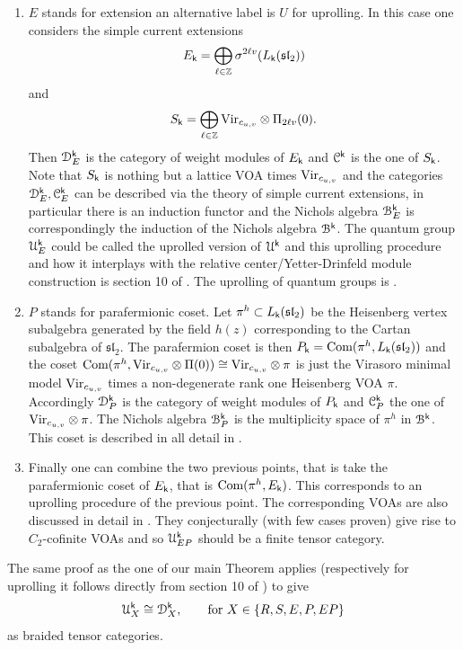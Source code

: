 \documentclass[a4paper, reqno]{amsart}
\theoremstyle{introTheorems}
\newcommand\cB{\mathcal{B}}
\newcommand\cC{\mathcal{C}}
\newcommand\cD{\mathcal{D}}
\newcommand\cU{\mathcal{U}}
\renewcommand\sl{\mathfrak{sl}}
\newcommand\Vir{\textup{Vir}}
\renewcommand{\1}{\mathbbold{1}}
\begin{document}
\begin{enumerate}
    The coset $\text{Com}(L_\ell(\sl_2), L_\ell(\sl_{2|1}))$ for $\ell$ related to $\k$ via the Feigin-Frenkel type relation $(\ell+1)(\k+1)=1$ can be described by a different, but similar, convolution operation.
    \item[(E)] $E$ stands for extension an alternative label is $U$ for uprolling. 
    In this case one considers the simple current extensions
    \[
    E_\k = \bigoplus_{\ell \in \mathbb Z} \sigma^{2\ell v}(L_\k(\sl_2))
    \]
    and 
    \[
    S_\k = \bigoplus_{\ell \in \mathbb Z} \Vir_{c_{u,v}}\otimes \Pi_{2\ell v}(0).
    \]
    Then $\cD^\k_E$ is the category of weight modules of $E_{\mathsf{k}}$ and $\cC^\k$ is the one of $S_{\mathsf{k}}$. Note that $S_{\mathsf{k}}$ is nothing but a lattice VOA times $\Vir_{c_{u,v}}$ and the categories $\cD^\k_E, \cC^\k_E$ can be described via the theory of simple current extensions, in particular there is an induction functor and the Nichols algebra $\cB^\k_E$ is correspondingly the induction of the Nichols algebra $\cB^\k$. The quantum group $\cU^\k_E$ could be called the uprolled version of $\cU^\k$ and this uprolling procedure and how it interplays with the relative center/Yetter-Drinfeld module construction is section 10 of \cite{CLR23}. The uprolling of quantum groups is \cite{CR4}.
    \item[(P)] $P$ stands for parafermionic coset. Let $\pi^h \subset L_\k(\sl_2)$ be the Heisenberg vertex subalgebra generated by the field $h(z)$ corresponding to the Cartan subalgebra of $\sl_2$. The parafermion coset is then $P_\k=\text{Com}(\pi^h, L_\k(\sl_2))$ and the coset $\text{Com}(\pi^h, \Vir_{c_{u,v}}\otimes \Pi(0)) \cong \Vir_{c_{u,v}}\otimes \pi$ is just the Virasoro minimal model $\Vir_{c_{u,v}}$ times a non-degenerate rank one Heisenberg VOA $\pi$. Accordingly $\cD^\k_P$ is the category of weight modules of $P_{\mathsf{k}}$ and $\cC^\k_P$ the one of $\Vir_{c_{u,v}}\otimes \pi$. The Nichols algebra $\cB^\k_P$ is the multiplicity space of $\pi^h$ in $\cB^\k$. This coset is described in all detail in \cite{ACR}. 
    \item[(EP)] Finally one can combine the two previous points, that is take the parafermionic coset of $E_{\mathsf{k}}$, that is $\text{Com}(\pi^h, E_{\mathsf{k}})$. This corresponds to an uprolling procedure of the previous point. The corresponding VOAs are also discussed in detail in \cite{ACR}. They conjecturally (with few cases proven) give rise to $C_2$-cofinite VOAs and so $\cU^\k_{EP}$ should be a finite tensor category. 
\end{enumerate}
The same proof as the one of our main Theorem applies (respectively for uprolling it follows directly from section 10 of \cite{CLR23}) to give 
\[
\cU^\k_X \cong \cD^\k_X, \qquad \text{for} \ X \in \{R, S, E, P, EP\}
\]
as braided tensor categories. 
\end{document}
